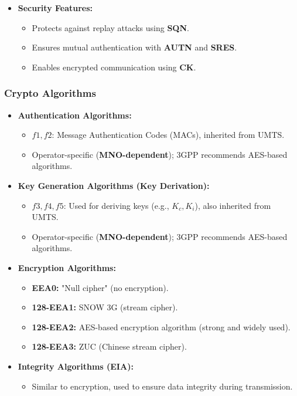 \begin{itemize}
    \item \textbf{Security Features:}
    \begin{itemize}
        \item Protects against replay attacks using \textbf{SQN}.
        \item Ensures mutual authentication with \textbf{AUTN} and \textbf{SRES}.
        \item Enables encrypted communication using \textbf{CK}.
    \end{itemize}
\end{itemize}

\subsubsection{Crypto Algorithms}
\begin{itemize}
    \item \textbf{Authentication Algorithms:}
    \begin{itemize}
        \item \(f1, f2\): Message Authentication Codes (MACs), inherited from UMTS.
        \item Operator-specific (\textbf{MNO-dependent}); 3GPP recommends AES-based algorithms.
    \end{itemize}

    \item \textbf{Key Generation Algorithms (Key Derivation):}
    \begin{itemize}
        \item \(f3, f4, f5\): Used for deriving keys (e.g., \(K_c, K_i\)), also inherited from UMTS.
        \item Operator-specific (\textbf{MNO-dependent}); 3GPP recommends AES-based algorithms.
    \end{itemize}

    \item \textbf{Encryption Algorithms:}
    \begin{itemize}
        \item \textbf{EEA0:} "Null cipher" (no encryption).
        \item \textbf{128-EEA1:} SNOW 3G (stream cipher).
        \item \textbf{128-EEA2:} AES-based encryption algorithm (strong and widely used).
        \item \textbf{128-EEA3:} ZUC (Chinese stream cipher).
    \end{itemize}

    \item \textbf{Integrity Algorithms (EIA):}
    \begin{itemize}
        \item Similar to encryption, used to ensure data integrity during transmission.
    \end{itemize}
\end{itemize}

